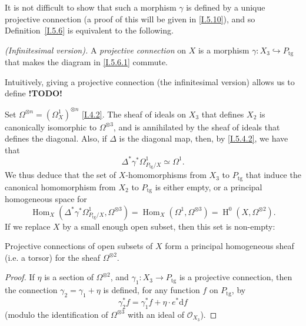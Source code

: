 \documentclass{report}
\theoremstyle{plain}
\newenvironment{proposition}[1]
    {\renewcommand\theinnercustomproposition{#1}\innercustomproposition}
    {\endinnercustomproposition}
\theoremstyle{definition}
\newenvironment{definition}[1]
    {\renewcommand\theinnercustomdefinition{#1}\innercustomdefinition}
    {\endinnercustomdefinition}
\newenvironment{env}[1]
    {\renewcommand\theinnercustomenv{#1}\innercustomenv}
    {\endinnercustomenv}
\newcommand{\sh}{\mathscr}
\newcommand{\dd}{\mathrm{d}}
\newcommand{\tg}{\mathrm{tg}}
\DeclareMathOperator{\Hom}{Hom}
\DeclareMathOperator{\HH}{H}
\newcommand{\todo}{\textbf{ !TODO! }}
\newcommand{\oldpage}[1]{\marginpar{\footnotesize$\Big\vert$ \textit{p.~#1}}}
\begin{document}
It is not difficult to show that such a morphism $\gamma$ is defined by a unique projective connection (a proof of this will be given in \cref{I.5.10}), and so Definition~\cref{I.5.6} is equivalent to the following.

\begin{definition}{5.6~bis}
\label{I.5.6bis}
  \emph{(Infinitesimal version).}
  A \emph{projective connection} on $X$ is a morphism $\gamma\colon X_3\hookrightarrow P_\tg$ that makes the diagram in \cref{I.5.6.1} commute.
\end{definition}

Intuitively, giving a projective connection (the infinitesimal version) allows us to define \todo

\begin{env}{5.7}
\label{I.5.7}
  Set $\Omega^{\otimes n}=(\Omega_X^1)^{\otimes n}$ \cref{I.4.2}.
  The sheaf of ideals on $X_3$ that defines $X_2$ is
\oldpage{32}
  canonically isomorphic to $\Omega^{\otimes3}$, and is annihilated by the sheaf of ideals that defines the diagonal.
  Also, if $\Delta$ is the diagonal map, then, by \cref{I.5.4.2}, we have that
  \[
    \Delta^*\gamma^*\Omega_{P_\tg/X}^1 \simeq \Omega^1.
  \]
  We thus deduce that the set of $X$-homomorphisms from $X_3$ to $P_\tg$ that induce the canonical homomorphism from $X_2$ to $P_\tg$ is either empty, or a principal homogeneous space for
  \[
    \Hom_X(\Delta^*\gamma^*\Omega_{P_\tg/X}^1, \Omega^{\otimes3})
    = \Hom_X(\Omega^1,\Omega^{\otimes3})
    = \HH^0(X,\Omega^{\otimes2}).
  \]
  If we replace $X$ by a small enough open subset, then this set is non-empty:
\end{env}

\begin{proposition}{5.8}
\label{I.5.8}
  Projective connections of open subsets of $X$ form a principal homogeneous sheaf (i.e. a torsor) for the sheaf $\Omega^{\otimes2}$.
\end{proposition}

\begin{proof}
  If $\eta$ is a section of $\Omega^{\otimes2}$, and $\gamma_1\colon X_3\to P_\tg$ is a projective connection, then the connection $\gamma_2=\gamma_1+\eta$ is defined, for any function $f$ on $P_\tg$, by
  \[
  \label{I.5.8.1}
    \gamma_2^*f = \gamma_1^*f + \eta\cdot e^*\dd f
  \tag{5.8.1}
  \]
  (modulo the identification of $\Omega^{\otimes3}$ with an ideal of $\sh{O}_{X_3}$).
\end{proof}
\end{document}
